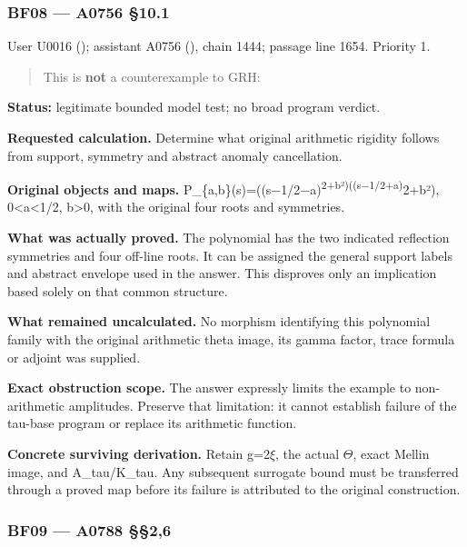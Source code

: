 \documentclass[10pt,a4paper,oneside]{report}
\begin{document}
\subsubsection{BF08 --- A0756 §10.1}\label{bf08-a0756-10.1}

User U0016 (\protect{});
assistant A0756 (\protect{}),
chain 1444; passage line 1654. Priority 1.

\begin{quote}
This is \textbf{not} a counterexample to GRH:
\end{quote}

\textbf{Status:} legitimate bounded model test; no broad program
verdict.

\textbf{Requested calculation.} Determine what original arithmetic
rigidity follows from support, symmetry and abstract anomaly
cancellation.

\textbf{Original objects and maps.}
P\_\{a,b\}(s)=((s\allowbreak{}\ensuremath{−}\allowbreak{}1/2\allowbreak{}\ensuremath{−}\allowbreak{}a)\textsuperscript{2+b²)((s\allowbreak{}\ensuremath{−}\allowbreak{}1/2+a)}2+b²),
0\textless a\textless1/2, b\textgreater0, with the original four roots
and symmetries.

\textbf{What was actually proved.} The polynomial has the two indicated
reflection symmetries and four off-line roots. It can be assigned the
general support labels and abstract envelope used in the answer. This
disproves only an implication based solely on that common structure.

\textbf{What remained uncalculated.} No morphism identifying this
polynomial family with the original arithmetic theta image, its gamma
factor, trace formula or adjoint was supplied.

\textbf{Exact obstruction scope.} The answer expressly limits the
example to non-arithmetic amplitudes. Preserve that limitation: it
cannot establish failure of the tau-base program or replace its
arithmetic function.

\textbf{Concrete surviving derivation.} Retain
g=2\allowbreak{}\ensuremath{ξ}\allowbreak{}, the actual
\allowbreak{}\ensuremath{Θ}\allowbreak{}, exact Mellin image, and
A\_tau/K\_tau. Any subsequent surrogate bound must be transferred
through a proved map before its failure is attributed to the original
construction.

\subsubsection{BF09 --- A0788 §§2,6}\label{bf09-a0788-26}
\end{document}
